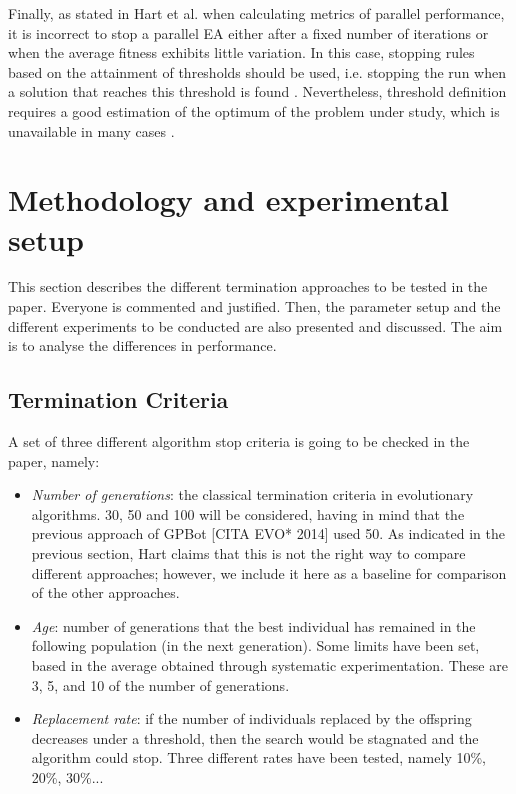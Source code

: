 \documentclass[runningheads,a4paper]{llncs}
\begin{document}
Finally, as stated in Hart et al. \cite{Hart1996} when calculating metrics of parallel performance, it is incorrect to stop a parallel EA either after a fixed number of iterations or when the average fitness exhibits little variation. In this case, stopping rules based on the attainment of thresholds should be used, i.e. stopping the run when a solution that reaches this threshold is found \cite{Sena2001}. Nevertheless, threshold definition requires a good estimation of the optimum of the problem under study, which is unavailable in many cases \cite{Safe2004}.


\section{Methodology and experimental setup}
\label{sec:met}

This section describes the different termination approaches to be tested in the paper. Everyone is commented and justified.
Then, the parameter setup and the different experiments to be conducted are also presented and discussed. The aim is to analyse the differences in performance.

\subsection{Termination Criteria}
A set of three different algorithm stop criteria is going to be checked in the paper, namely:
\begin{itemize}
    \item \textit{Number of generations}: the classical termination
      criteria in evolutionary algorithms. 30, 50 and 100 will be
      considered, having in mind that the previous approach of GPBot
      [CITA EVO* 2014] used 50. As indicated in the previous section,
      Hart  \cite{Hart1996} claims that this is not the right way to
      compare different approaches; however, we include it here as a
      baseline for comparison of the other approaches. 
    \item \textit{Age}: number of generations that the best individual has remained in the following population (in the next generation). Some limits have been set, based in the average obtained through systematic experimentation. These are 3, 5, and 10 of the number of generations.
    \item \textit{Replacement rate}: if the number of individuals
      replaced by the offspring decreases under a threshold, then the
      search would be stagnated and the algorithm could stop. Three
      different rates have been tested, namely 10\%, 20\%, 30\%... %
\end{itemize}
\end{document}
